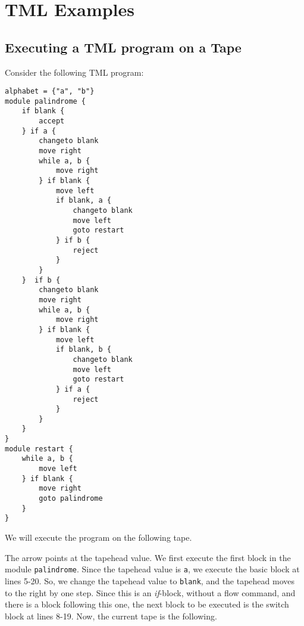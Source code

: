 \chapter{TML Examples}
\section{Executing a TML program on a Tape}
Consider the following TML program:
\begin{lstlisting}[language=TML]
alphabet = {"a", "b"}
module palindrome {
    if blank {
        accept
    } if a {
        changeto blank
        move right
        while a, b {
            move right
        } if blank {
            move left
            if blank, a {
                changeto blank
                move left
                goto restart
            } if b {
                reject
            }
        }
    }  if b {
        changeto blank
        move right
        while a, b {
            move right
        } if blank {
            move left
            if blank, b {
                changeto blank
                move left
                goto restart
            } if a {
                reject
            }
        }
    }
}
module restart {
    while a, b {
        move left
    } if blank {
        move right
        goto palindrome
    }
}
\end{lstlisting}
We will execute the program on the following tape.
\begin{figure}[H]
    \centering
\end{figure}
\noindent The arrow points at the tapehead value. We first execute the first block in the module \texttt{palindrome}. Since the tapehead value is \texttt{a}, we execute the basic block at lines 5-20. So, we change the tapehead value to \texttt{blank}, and the tapehead moves to the right by one step. Since this is an \textit{if}-block, without a flow command, and there is a block following this one, the next block to be executed is the switch block at lines 8-19. Now, the current tape is the following.
\begin{figure}[H]
    \centering
\end{figure}
